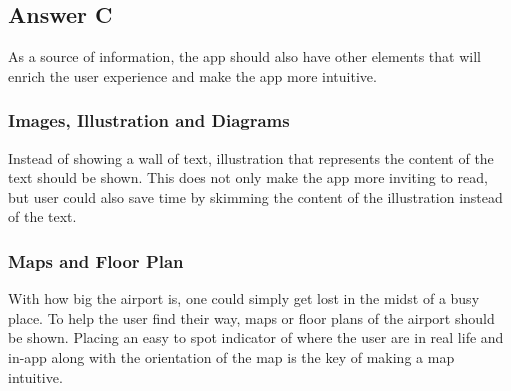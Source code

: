 \documentclass[
  11pt, %
]{assignment}
\begin{document}
\subsection*{Answer C}

As a source of information, the app should also have other elements that will enrich the user experience and make the app more intuitive.

\subsubsection*{Images, Illustration and Diagrams}

Instead of showing a wall of text, illustration that represents the content of the text should be shown. This does not only make the app more inviting to read, but user could also save time by skimming the content of the illustration instead of the text.

\subsubsection*{Maps and Floor Plan}

With how big the airport is, one could simply get lost in the midst of a busy place. To help the user find their way, maps or floor plans of the airport should be shown. Placing an easy to spot indicator of where the user are in real life and in-app along with the orientation of the map is the key of making a map intuitive.
\end{document}
